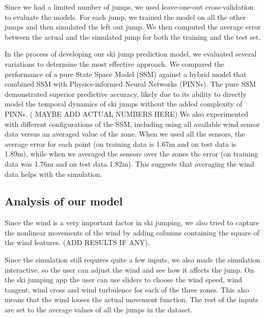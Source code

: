 \documentclass[sigconf,natbib=false, language=english]{acmart}
\begin{document}
Since we had a limited number of jumps, we used leave-one-out cross-validation to evaluate the models.
For each jump, we trained the model on all the other jumps and then simulated the left out jump. We then computed 
the average error between the actual and the simulated jump for both the training and the test set.

In the process of developing our ski jump prediction model, we evaluated several 
variations to determine the most effective approach. We compared the performance 
of a pure State Space Model (SSM) against a hybrid model that combined SSM with 
Physics-informed Neural Networks (PINNs). The pure SSM demonstrated superior predictive 
accuracy, likely due to its ability to directly model the temporal dynamics of ski jumps 
without the added complexity of PINNs. ( MAYBE ADD ACTUAL NUMBERS HERE) 
We also experimented with different configurations of the SSM, including using
all available wind sensor data versus an averaged value of the zone. When we used all the sensors,
the average error for each point (on training data is 1.67m and on test data is 1.89m), while when we averaged the sensors 
over the zones the error (on training data was 1.76m and on test data 1.82m). This suggests that averaging the wind data helps
with the simulation.

\subsection{Analysis of our model}

Since the wind is a very important factor in ski jumping, we also tried to capture 
the nonlinear movements of the wind by adding columns containing the square of the wind features.
(ADD RESULTS IF ANY). 

Since the simulation still requires quite a few inputs, we also made the simulation
interactive, so the user can adjust the wind and see how it affects the jump.
On the ski jumping app the user can use sliders to choose the wind speed, wind tangent,
wind cross and wind turbulence for each of the three zones. This also means that the wind looses 
the actual movement function. The rest of the inputs are set to the average values 
of all the jumps in the dataset. 

\end{document}

